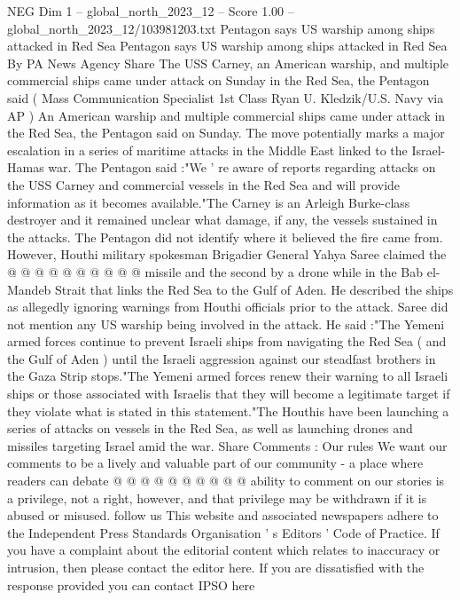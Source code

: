 \begin{textsample}{NEG Dim 1 – global\_north\_2023\_12 – Score 1.00 – global\_north\_2023\_12/103981203.txt}  \label{ex:f1_neg_365}
Pentagon says US warship among ships attacked in Red Sea Pentagon says US warship among ships attacked in Red Sea By PA News Agency Share The USS Carney, an American warship, and multiple commercial ships came under attack on Sunday in the Red Sea, the Pentagon said ( Mass Communication Specialist 1st Class Ryan U.
Kledzik/U.S.
Navy via AP ) An American warship and multiple commercial ships came under attack in the Red Sea, the Pentagon said on Sunday.
The move potentially marks a major escalation in a series of maritime attacks in the Middle East linked to the Israel-Hamas war.
The Pentagon said :"We ' re aware of reports regarding attacks on the USS Carney and commercial vessels in the Red Sea and will provide information as it becomes available."The Carney is an Arleigh Burke-class destroyer and it remained unclear what damage, if any, the vessels sustained in the attacks.
The Pentagon did not identify where it believed the fire came from.
However, Houthi military spokesman Brigadier General Yahya Saree claimed the @ @ @ @ @ @ @ @ @ @ missile and the second by a drone while in the Bab el-Mandeb Strait that links the Red Sea to the Gulf of Aden.
He described the ships as allegedly ignoring warnings from Houthi officials prior to the attack.
Saree did not mention any US warship being involved in the attack.
He said :"The Yemeni armed forces continue to prevent Israeli ships from navigating the Red Sea ( and the Gulf of Aden ) until the Israeli aggression against our steadfast brothers in the Gaza Strip stops."The Yemeni armed forces renew their warning to all Israeli ships or those associated with Israelis that they will become a legitimate target if they violate what is stated in this statement."The Houthis have been launching a series of attacks on vessels in the Red Sea, as well as launching drones and missiles targeting Israel amid the war.
Share Comments : Our rules We want our comments to be a lively and valuable part of our community - a place where readers can debate @ @ @ @ @ @ @ @ @ @ ability to comment on our stories is a privilege, not a right, however, and that privilege may be withdrawn if it is abused or misused. follow us This website and associated newspapers adhere to the Independent Press Standards Organisation ' s Editors ' Code of Practice.
If you have a complaint about the editorial content which relates to inaccuracy or intrusion, then please contact the editor here.
If you are dissatisfied with the response provided you can contact IPSO here

\end{textsample}

